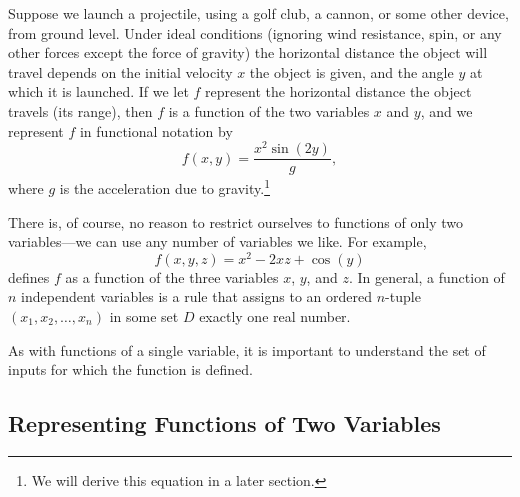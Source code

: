 Suppose we launch a projectile, using a golf club, a cannon, or some
other device, from ground level. Under ideal conditions (ignoring wind
resistance, spin, or any other forces except the force of gravity) the
horizontal distance the object will travel depends on the initial
velocity $x$ the object is given, and the angle $y$ at which it is
launched. If we let $f$ represent the horizontal distance the object
travels (its range), then $f$ is a function of the two variables $x$
and $y$, and we represent $f$ in functional notation by
\[f(x,y) = \frac{x^2 \sin(2 y)}{g},\] where $g$ is the acceleration
due to gravity.\footnote{We will derive this equation in a later section.}

\vspace*{5pt}
\nin {}
\vspace*{5pt}


There is, of course, no reason to restrict ourselves to functions of
only two variables---we can use any number of variables we like. For
example,
\[f(x,y,z) = x^2 - 2xz + \cos(y)\] 
defines $f$ as a function of the
three variables $x$, $y$, and $z$. In general, a function of $n$
independent variables is a rule that assigns to an ordered $n$-tuple
$(x_1, x_2, \ldots, x_n)$ in some set $D$ exactly one real number.

As with functions of a single variable, it is important to understand
the set of inputs for which the function is defined.

\vspace*{5pt}
\nin {} \vspace*{5pt}



\subsection*{Representing Functions of Two Variables}

